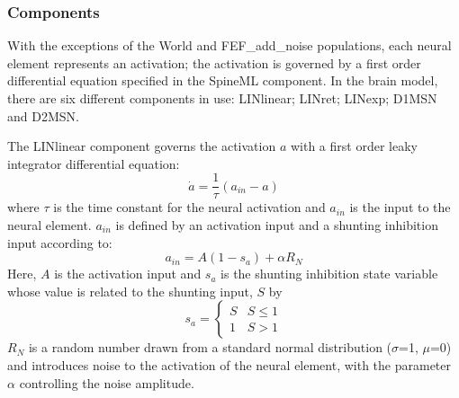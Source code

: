\documentclass{frontiersSCNS}
\begin{document}

\subsubsection{Components}

With the exceptions of the World and FEF\_add\_noise populations, each
neural element represents an activation; the activation is governed by
a first order differential equation specified in the SpineML
component. In the brain model, there are six different components in
use: LINlinear; LINret; LINexp; D1MSN and D2MSN.

The LINlinear component governs the activation $a$ with a first order
leaky integrator differential equation:
\begin{equation}
   \dot{a} = \frac{1}{\tau}(a_{in}-a)
\end{equation}
where $\tau$ is the time constant for the neural activation and
$a_{in}$ is the input to the neural element. $a_{in}$ is defined by an
activation input and a shunting inhibition input according to:
\begin{equation}
   a_{in} = A(1-s_a)+\alpha R_N
\end{equation}
Here, $A$ is the activation input and $s_a$ is the shunting inhibition
state variable whose value is related to the shunting input, $S$ by
\begin{equation}
   s_a = \begin{cases}
      S & S\leq 1 \\
      1 & S > 1
   \end{cases}
\end{equation}
$R_N$ is a random number drawn from a standard normal distribution
($\sigma$=1, $\mu$=0) and introduces noise to the activation of the
neural element, with the parameter $\alpha$ controlling the noise
amplitude.
\end{document}
